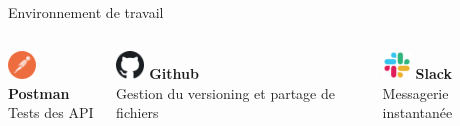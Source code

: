 \documentclass{beamer}
\begin{document}
\begin{frame}[label=environnement]{Environnement de travail}
\begin{center}
\begin{minipage}{0.9\textwidth}
\begin{columns}[T, onlytextwidth]
        			
        				\begin{minipage}[t][2cm][t]{\linewidth}
        					\raggedright
          				\includegraphics[width=0.75cm, height=0.75cm]{../img/logo_postman.png}
          				\hspace{0.6cm} \textbf{Postman} \\
          				Tests des API
          			\end{minipage}
          			\vspace{0.7em}
          			\pause
          			
          			\begin{minipage}[t][2cm][t]{\linewidth}
          				\raggedright
          				\includegraphics[width=0.75cm, height=0.75cm]{../img/logo_github.png}
          				\hspace{0.6cm} \textbf{Github} \\
          				Gestion du versioning et partage de fichiers
          			\end{minipage}
          			\vspace{0.7em}
          			\pause
          			
          			\begin{minipage}[t][2cm][t]{\linewidth}
          				\raggedright
          				\includegraphics[width=0.75cm, height=0.75cm]{../img/logo_slack.png}
          				\hspace{0.6cm} \textbf{Slack} \\
          				Messagerie instantanée
          			\end{minipage}

      		\end{columns}
  		\end{minipage}
	\end{center}
	\vfill
\end{frame}
\end{document}
